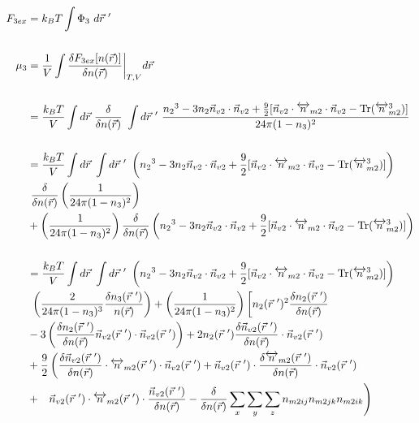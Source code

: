 \documentclass[double,12pt]{beavtex}
\begin{document}
\begin{align}
  F_{3ex} &= k_BT\int \Phi_3 ~d\vec r~'  \\ 
  \nonumber\\ 
  \mu_3 &= \frac{1}{V}\int \frac{\delta F_{3ex}[n(\vec r)]}{\delta n(\vec r)}
  \bigg|_{T,V} d\vec r \\ \nonumber \\
%
   &= \frac{k_BT}{V}\int d\vec r~\frac{\delta}{\delta n(\vec r)}~\int 
   d\vec r~'~\frac{{n_2}^3-3n_2\vec{n}_{v2}\cdot\vec{n}_{v2}+\frac{9}{2}
    [\vec{n}_{v2}\cdot{\overleftrightarrow{n}_{m2}}\cdot{\vec{n}_{v2}}
    -\operatorname{Tr}({\overleftrightarrow{n}^3_{m2}})]}{24\pi(1-n_3)^2}
     \nonumber \\ \\
%
     &=\frac{k_BT}{V}\int d\vec r~\int d\vec r~'~ \left( {n_2}^3-3n_2
     \vec{n}_{v2}\cdot\vec{n}_{v2} 
     +\frac{9}{2}[\vec{n}_{v2}\cdot{\overleftrightarrow{n}_{m2}}\cdot{
     \vec{n}_{v2}}-\operatorname{Tr}({\overleftrightarrow{n}^3_{m2}})]
     \right) \nonumber\\
      &~ \frac{\delta}{\delta n(\vec r)}\left(\frac{1}{24\pi(1-n_3)^2}
      \right) \nonumber\\
     &+ \left(\frac{1}{24\pi(1-n_3)^2}\right)\frac{\delta}
     {\delta n(\vec r)}\left({n_2}^3-3n_2\vec{n}_{v2}\cdot\vec{n}_{v2}
     +\frac{9}{2}[\vec{n}_{v2}\cdot{\overleftrightarrow{n}_{m2}}\cdot{
     \vec{n}_{v2}}-\operatorname{Tr}({\overleftrightarrow{n}^3_{m2}})]
     \right) \\ \nonumber \\
%
    &=\frac{k_BT}{V}\int d\vec r~\int d\vec r~'~\left( {n_2}^3-3n_2
    \vec{n}_{v2}\cdot\vec{n}_{v2} 
     +\frac{9}{2}[\vec{n}_{v2}\cdot{\overleftrightarrow{n}_{m2}}\cdot{
     \vec{n}_{v2}}-\operatorname{Tr}({\overleftrightarrow{n}^3_{m2}})]
     \right) \nonumber\\
     &~\left(\frac{2}{24\pi(1-n_3)^3}\frac{\delta n_3(\vec r~')}{n(\vec r)}
     \right) 
     + \left(\frac{1}{24\pi(1-n_3)^2}\right)\left[n_2(\vec r~')^2
     \frac{\delta n_2(\vec r~')}{\delta n(\vec r)} \color{white}\right]
      \nonumber\\
     &- 3\left(\frac{\delta n_{2}(\vec r~')}{\delta n(\vec r)}\vec n_{v2}
     (\vec r~') \cdot \vec n_{v2}(\vec r~')\right) + 2n_2(\vec r~')\frac{\delta
     \vec n_{v2}(\vec r~')}{\delta n(\vec r)}\cdot \vec n_{v2}(\vec r~') 
     \nonumber\\
     &+\frac{9}{2}\left(\frac{\delta \vec n_{v2}(\vec r~')}{\delta n(\vec r)}
     \cdot \overleftrightarrow n_{m2}(\vec r~')\cdot \vec n_{v2}( \vec r~')
     +\vec n_{v2}(\vec r~')\cdot \frac{\delta \overleftrightarrow n_{m2}
     (\vec r~')}{\delta n(\vec r)}\cdot \vec n_{v2}(\vec r~')\color{white}
     \right)\nonumber\\
     &+ \color{white}\left(\color{black}\vec n_{v2}(\vec r~')\cdot 
     \overleftrightarrow n_{m2}(\vec r~')
     \cdot \frac{\vec n_{v2}(\vec r~')}{\delta n(\vec r)}-
     \frac{\delta}{\delta n(\vec r)}\sum_x\sum_y\sum_z n_{m2ij}n_{m2jk}
     n_{m2ik}\right) 
\end{align} 
\end{document}
